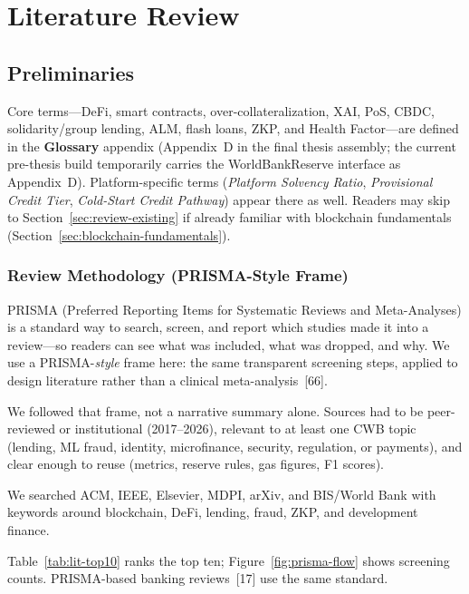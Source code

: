 \documentclass[12pt, a4paper]{report}
\begin{document}
\chapter{Literature Review}

\section{Preliminaries}
\label{sec:preliminaries}

Core terms---DeFi, smart contracts, over-collateralization, XAI, PoS, CBDC, solidarity/group lending, ALM, flash loans, ZKP, and Health Factor---are defined in the \textbf{Glossary} appendix (Appendix~D in the final thesis assembly; the current pre-thesis build temporarily carries the WorldBankReserve interface as Appendix~D). Platform-specific terms (\textit{Platform Solvency Ratio}, \textit{Provisional Credit Tier}, \textit{Cold-Start Credit Pathway}) appear there as well. Readers may skip to Section~\ref{sec:review-existing} if already familiar with blockchain fundamentals (Section~\ref{sec:blockchain-fundamentals}).

\subsection{Review Methodology (PRISMA-Style Frame)}
\label{sec:lit-prisma}

PRISMA (Preferred Reporting Items for Systematic Reviews and Meta-Analyses) is a standard way to search, screen, and report which studies made it into a review---so readers can see what was included, what was dropped, and why. We use a PRISMA-\emph{style} frame here: the same transparent screening steps, applied to design literature rather than a clinical meta-analysis~[66].

We followed that frame, not a narrative summary alone. Sources had to be peer-reviewed or institutional (2017--2026), relevant to at least one CWB topic (lending, ML fraud, identity, microfinance, security, regulation, or payments), and clear enough to reuse (metrics, reserve rules, gas figures, F1 scores).

We searched ACM, IEEE, Elsevier, MDPI, arXiv, and BIS/World Bank with keywords around blockchain, DeFi, lending, fraud, ZKP, and development finance.

Table~\ref{tab:lit-top10} ranks the top ten; Figure~\ref{fig:prisma-flow} shows screening counts. PRISMA-based banking reviews~[17] use the same standard.
\end{document}
